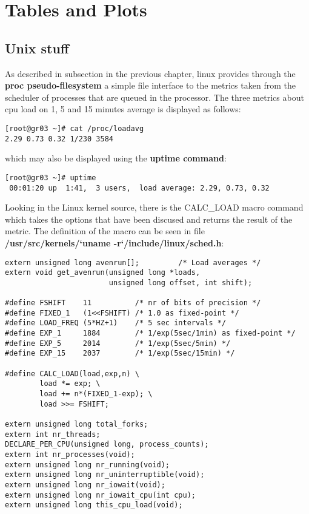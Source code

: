 \section{Tables and Plots}
\subsection{Unix stuff}

As described in subsection  in the previous chapter, linux provides through the {\bf proc pseudo-filesystem} a simple file interface to the metrics taken from the scheduler of processes that are queued in the processor. The three metrics about cpu load on 1, 5 and 15 minutes average is displayed as follows:

\begin{verbatim}
[root@gr03 ~]# cat /proc/loadavg 
2.29 0.73 0.32 1/230 3584
\end{verbatim}

which may also be displayed using the {\bf uptime command}:

\begin{verbatim}
[root@gr03 ~]# uptime
 00:01:20 up  1:41,  3 users,  load average: 2.29, 0.73, 0.32
\end{verbatim}

Looking in the Linux kernel source, there is the CALC\_LOAD macro command which takes the options that have been discused and returns the result of the metric. The definition of the macro can be seen in file {\bf /usr/src/kernels/`uname -r`/include/linux/sched.h}:

\begin{lstlisting}[caption=Linux kernel CALC\_LOAD macro]
extern unsigned long avenrun[];         /* Load averages */
extern void get_avenrun(unsigned long *loads, 
                        unsigned long offset, int shift);

#define FSHIFT    11          /* nr of bits of precision */
#define FIXED_1   (1<<FSHIFT) /* 1.0 as fixed-point */
#define LOAD_FREQ (5*HZ+1)    /* 5 sec intervals */
#define EXP_1     1884        /* 1/exp(5sec/1min) as fixed-point */
#define EXP_5     2014        /* 1/exp(5sec/5min) */
#define EXP_15    2037        /* 1/exp(5sec/15min) */

#define CALC_LOAD(load,exp,n) \
        load *= exp; \
        load += n*(FIXED_1-exp); \
        load >>= FSHIFT;

extern unsigned long total_forks;
extern int nr_threads;
DECLARE_PER_CPU(unsigned long, process_counts);
extern int nr_processes(void);
extern unsigned long nr_running(void);
extern unsigned long nr_uninterruptible(void);
extern unsigned long nr_iowait(void);
extern unsigned long nr_iowait_cpu(int cpu);
extern unsigned long this_cpu_load(void);
\end{lstlisting}

